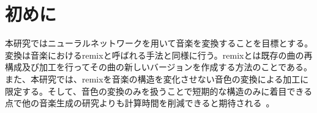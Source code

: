 \chapter{初めに}

本研究ではニューラルネットワークを用いて音楽を変換することを目標とする。変換は音楽におけるremixと呼ばれる手法と同様に行う。remixとは既存の曲の再構成及び加工を行ってその曲の新しいバージョンを作成する方法のことである。また、本研究では、remixを音楽の構造を変化させない音色の変換による加工に限定する。そして、音色の変換のみを扱うことで短期的な構造のみに着目できる点で他の音楽生成の研究よりも計算時間を削減できると期待される~\cite{Jukebox}。